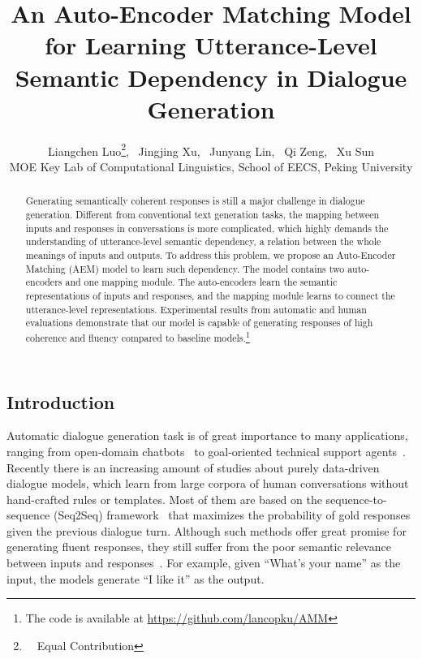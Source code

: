 \documentclass[11pt,a4paper]{article}
\title{ An Auto-Encoder Matching Model for Learning Utterance-Level Semantic Dependency in Dialogue Generation }
\author{
Liangchen Luo\thanks{\ \ Equal Contribution}, \
Jingjing Xu\footnotemark[1], \  
Junyang Lin, \ 
Qi Zeng, \ 
Xu Sun
\\ 
MOE Key Lab of Computational Linguistics, School of EECS, Peking University  \\
\email{\{luolc,jingjingxu,linjunyang,pkuzengqi,xusun\}@pku.edu.cn }}
\date{}
\begin{document}
\maketitle
\begin{CJK}{UTF8}{song}

\begin{abstract}


Generating semantically coherent responses is still a major challenge in dialogue generation. Different from conventional text generation tasks, the mapping between inputs and responses in conversations is more complicated, which highly demands the understanding of utterance-level semantic dependency, a relation between the whole meanings of inputs and outputs. To address this problem, we propose an Auto-Encoder Matching  (AEM) model to learn such  dependency. The model contains two auto-encoders and one mapping module. The auto-encoders learn the semantic representations of inputs and responses, and the mapping module learns to connect the utterance-level representations. Experimental results from automatic and human evaluations demonstrate that our model is capable of generating responses of high coherence and fluency compared to baseline models.\footnote{The code is available at \url{https://github.com/lancopku/AMM}} 







 

\end{abstract}

\section{Introduction}
Automatic dialogue generation task is of great importance to many applications, ranging from open-domain chatbots~\cite{DBLP:conf/coling/HigashinakaIMMKSHMM14, DBLP:journals/corr/VinyalsL15, DBLP:conf/emnlp/LiMRJGG16, DBLP:conf/emnlp/LiMSJRJ17,DBLP:conf/aaai/SuSHLC18} to goal-oriented technical support agents~\cite{DBLP:journals/corr/BordesW16, DBLP:journals/corr/abs-1712-02838, DBLP:conf/sigdial/AsriSSZHFMS17}. Recently there is an increasing amount of studies about purely data-driven dialogue models, which learn from large corpora of human conversations without hand-crafted rules or templates. Most of them are based on the sequence-to-sequence (Seq2Seq) framework~\cite{SutskeverVL14_seq2seq} that maximizes the probability of gold responses given the previous dialogue turn. Although such methods offer great promise for generating fluent responses, they still suffer from the poor semantic relevance between inputs and responses~\cite{jingjingxuemnlp18-01}. For example, given ``What's your name'' as the input, the models generate ``I like it'' as the output.


\end{CJK}
\end{document}

